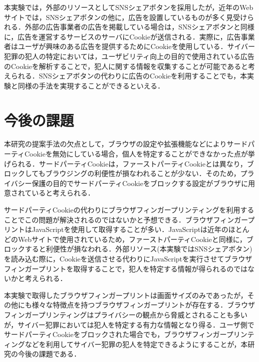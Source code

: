 \documentclass[10pt, a4paper]{jreport}
\begin{document}
本実験では，外部のリソースとしてSNSシェアボタンを採用したが，近年のWebサイトでは，SNSシェアボタンの他に，広告を設置しているものが多く見受けられる．外部の広告事業者の広告を掲載している場合は，SNSシェアボタンと同様に，広告を運営するサービスのサーバにCookieが送信される．実際に，広告事業者はユーザが興味のある広告を提供するためにCookieを使用している\cite{third_party_cookie_is_danger}．サイバー犯罪の犯人の特定においては，ユーザビリティ向上の目的で使用されている広告のCookieを解析することで，犯人に関する情報を収集することが可能であると考えられる．SNSシェアボタンの代わりに広告のCookieを利用することでも，本実験と同様の手法を実現することができるといえる．

\section{今後の課題}
本研究の提案手法の欠点として，ブラウザの設定や拡張機能などによりサードパーティCookieを無効にしている場合，個人を特定することができなかった点が挙げられる．サードパーティCookieは，ファーストパーティCookieとは異なり，ブロックしてもブラウジングの利便性が損なわれることが少ない．そのため，プライバシー保護の目的でサードパーティCookieをブロックする設定がブラウザに用意されていると考えられる．

サードパーティCookieの代わりにブラウザフィンガープリンティングを利用することでこの問題が解決されるのではないかと予想できる．ブラウザフィンガープリントはJavaScriptを使用して取得することが多い．JavaScriptは近年のほとんどのWebサイトで使用されているため，ファーストパーティCookieと同様に，ブロックすると利便性が損なわれる．外部リソース(本実験ではSNSシェアボタン)を読み込む際に，Cookieを送信させる代わりにJavaScriptを実行させてブラウザフィンガープリントを取得することで，犯人を特定する情報が得られるのではないかと考えられる．

本実験で取得したブラウザフィンガープリントは画面サイズのみであったが，その他にも様々な特徴点を持つブラウザフィンガープリントが存在する\cite{kind_of_fingerprints}\cite{canvas_fingerprinting}．ブラウザフィンガープリンティングはプライバシーの観点から脅威とされることも多いが，サイバー犯罪においては犯人を特定する有力な情報となり得る．ユーザ側でサードパーティCookieをブロックされた場合でも，ブラウザフィンガープリンティングなどを利用してサイバー犯罪の犯人を特定できるようにすることが，本研究の今後の課題である．
\end{document}
